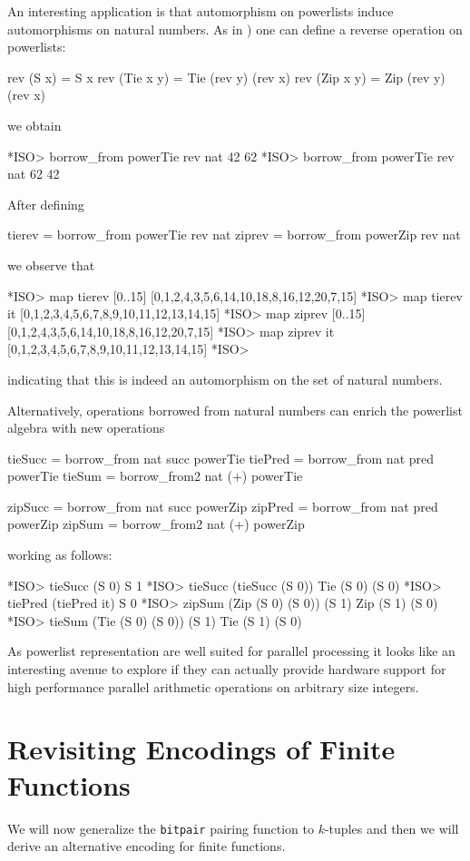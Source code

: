 \documentclass[]{INCLUDES/llncs}
\begin{document}
An interesting application is that automorphism on powerlists
induce automorphisms on natural numbers. As in 
\cite{Misra94powerlist:a}) one can define a reverse operation on powerlists:
\begin{code}
rev (S x) = S x
rev (Tie x y) = Tie (rev y) (rev x)
rev (Zip x y) = Zip (rev y) (rev x)
\end{code}
we obtain
\begin{codex}
*ISO> borrow_from powerTie rev nat 42
62
*ISO> borrow_from powerTie rev nat 62
42
\end{codex}
After defining
\begin{code}
tierev = borrow_from powerTie rev nat
ziprev = borrow_from powerZip rev nat
\end{code}
we observe that
\begin{codex}
*ISO> map tierev [0..15]
[0,1,2,4,3,5,6,14,10,18,8,16,12,20,7,15]
*ISO> map tierev it
[0,1,2,3,4,5,6,7,8,9,10,11,12,13,14,15]
*ISO> map ziprev [0..15]
[0,1,2,4,3,5,6,14,10,18,8,16,12,20,7,15]
*ISO> map ziprev it
[0,1,2,3,4,5,6,7,8,9,10,11,12,13,14,15]
*ISO> 
\end{codex}
indicating that this is indeed an automorphism on the set of natural numbers.

Alternatively, operations borrowed from natural numbers can enrich the powerlist
algebra with new operations
\begin{code}
tieSucc = borrow_from nat succ powerTie
tiePred = borrow_from nat pred powerTie
tieSum = borrow_from2 nat (+) powerTie

zipSucc = borrow_from nat succ powerZip
zipPred = borrow_from nat pred powerZip
zipSum = borrow_from2 nat (+) powerZip
\end{code}
working as follows:
\begin{codex}
*ISO> tieSucc (S 0)
S 1
*ISO> tieSucc (tieSucc (S 0))
Tie (S 0) (S 0)
*ISO> tiePred (tiePred it)
S 0
*ISO> zipSum (Zip (S 0) (S 0)) (S 1)
Zip (S 1) (S 0)
*ISO> tieSum (Tie (S 0) (S 0)) (S 1)
Tie (S 1) (S 0)
\end{codex}
As powerlist representation are well suited for parallel processing it looks
like an interesting avenue to explore if they can actually provide hardware
support for high performance parallel arithmetic operations on arbitrary size
integers.


\section{Revisiting Encodings of Finite Functions} \label{tfun}
We will now generalize the {\tt bitpair} pairing function to $k$-tuples and then we will 
derive an alternative encoding for finite functions. 
\end{document}
